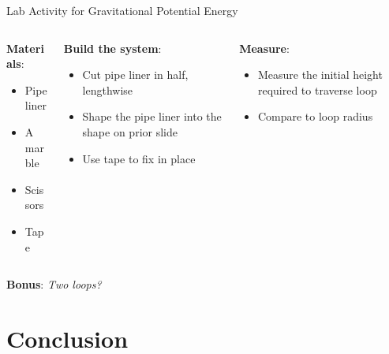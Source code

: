 \documentclass{beamer}
\begin{document}
\begin{frame}{Lab Activity for Gravitational Potential Energy}
\begin{columns}[T]
\begin{column}{0.33\textwidth}
\textbf{Materials}:
\begin{itemize}
\item Pipe liner
\item A marble
\item Scissors
\item Tape
\end{itemize}
\end{column}
\begin{column}{0.33\textwidth}
\textbf{Build the system}:
\begin{itemize}
\item Cut pipe liner in half, lengthwise
\item Shape the pipe liner into the shape on prior slide
\item Use tape to fix in place
\end{itemize}
\end{column}
\begin{column}{0.33\textwidth}
\textbf{Measure}:
\begin{itemize}
\item Measure the initial height required to traverse loop
\item Compare to loop radius
\end{itemize}
\end{column}
\end{columns}
\alert{\textbf{Bonus}: \textit{Two loops?}}
\end{frame}

\section{Conclusion}
\end{document}
